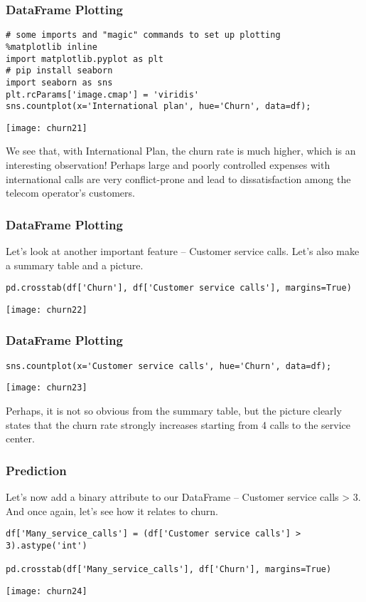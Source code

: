 \begin{frame}[fragile]\frametitle{DataFrame Plotting}	
\begin{lstlisting}
# some imports and "magic" commands to set up plotting 
%matplotlib inline 
import matplotlib.pyplot as plt
# pip install seaborn 
import seaborn as sns
plt.rcParams['image.cmap'] = 'viridis'
sns.countplot(x='International plan', hue='Churn', data=df);
\end{lstlisting}
\begin{center}
\texttt{[image: churn21]}
\end{center}
We see that, with International Plan, the churn rate is much higher, which is an interesting observation! Perhaps large and poorly controlled expenses with international calls are very conflict-prone and lead to dissatisfaction among the telecom operator's customers.
\end{frame}

\begin{frame}[fragile]\frametitle{DataFrame Plotting}	
Let’s look at another important feature – Customer service calls. Let’s also make a summary table and a picture.
\begin{lstlisting}
pd.crosstab(df['Churn'], df['Customer service calls'], margins=True)
\end{lstlisting}
\begin{center}
\texttt{[image: churn22]}
\end{center}
\end{frame}

\begin{frame}[fragile]\frametitle{DataFrame Plotting}	
\begin{lstlisting}
sns.countplot(x='Customer service calls', hue='Churn', data=df);
\end{lstlisting}
\begin{center}
\texttt{[image: churn23]}
\end{center}
Perhaps, it is not so obvious from the summary table, but the picture clearly states that the churn rate strongly increases starting from 4 calls to the service center.
\end{frame}

\begin{frame}[fragile]\frametitle{Prediction}	
Let’s now add a binary attribute to our DataFrame – Customer service calls > 3. And once again, let's see how it relates to churn.
\begin{lstlisting}
df['Many_service_calls'] = (df['Customer service calls'] > 3).astype('int')

pd.crosstab(df['Many_service_calls'], df['Churn'], margins=True)
\end{lstlisting}
\begin{center}
\texttt{[image: churn24]}
\end{center}
\end{frame}

